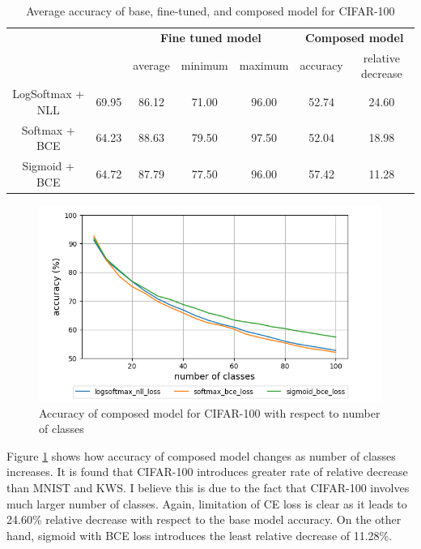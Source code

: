 \documentclass{article}
\begin{document}
\begin{table}[t]
    \centering
    \begin{tabular}{ccccccc}
        \toprule[1pt]
        \multirow{2}{*}{\raisebox{-3\heavyrulewidth}{\bf Loss function}} &
        \multirow{2}{*}{\raisebox{-3\heavyrulewidth}{\bf Base model}} &
        \multicolumn{3}{c}{\bf Fine tuned model } &
        \multicolumn{2}{c}{\bf Composed model } \\
        \cmidrule(lr){3-5}
        \cmidrule(lr){6-7}
        & & average & minimum & maximum & accuracy & relative decrease \\
        \midrule
        LogSoftmax + NLL & 69.95 & 86.12 & 71.00 & 96.00 & 52.74 & 24.60 \\
        Softmax + BCE & 64.23 & 88.63 & 79.50 & 97.50 & 52.04 & 18.98 \\
        Sigmoid + BCE & 64.72 & 87.79 & 77.50 & 96.00 & 57.42 & 11.28 \\
        \bottomrule[1pt]
    \end{tabular}
    \caption{Average accuracy of base, fine-tuned, and composed model for CIFAR-100}
    \label{table:cifar}
\end{table}

\begin{figure}[t]
    \centering
    \includegraphics[scale=0.5,trim={0mm 0mm 0mm 0mm},clip]{cifar100.png}
    \caption{Accuracy of composed model for CIFAR-100 with respect to number of classes}
    \label{figure:composed_cifar}
\end{figure}

Figure \ref{figure:composed_cifar} shows how accuracy of composed model changes as number of classes increases. It is found that CIFAR-100 introduces greater rate of relative decrease than MNIST and KWS. I believe this is due to the fact that CIFAR-100 involves much larger number of classes. Again, limitation of CE loss is clear as it leads to 24.60\% relative decrease with respect to the base model accuracy. On the other hand, sigmoid with BCE loss introduces the least relative decrease of 11.28\%.
\end{document}
